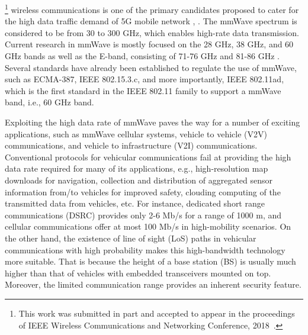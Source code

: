 \documentclass{ieeeaccess}
\begin{document}
\footnote{This work was submitted in part and accepted to appear in the proceedings of IEEE Wireless Communications and Networking Conference, 2018~\cite{shaham2018raf}.}
 wireless communications is one of the primary candidates proposed to cater for the high data traffic demand of 5G mobile network \cite{ref1}, \cite{ref2}. The mmWave spectrum is considered to be from 30 to 300 GHz, which enables high-rate data transmission. Current research in mmWave is mostly focused on the 28 GHz, 38 GHz, and 60 GHz bands as well as the E-band, consisting of 71-76 GHz and 81-86 GHz \cite{sss1}. Several standards have already been established to regulate the use of mmWave, such as ECMA-387\cite{s2}, IEEE 802.15.3.c\cite{s3}, and more importantly, IEEE 802.11ad\cite{s4}, which is the first standard in the IEEE 802.11 family to support a mmWave band, i.e., 60 GHz band.


Exploiting the high data rate of mmWave paves the way for a number of exciting applications, such as mmWave cellular systems, vehicle to vehicle (V2V) communications, and vehicle to infrastructure (V2I) communications. Conventional protocols for vehicular communications fail at providing the high data rate required for many of its applications, e.g., high-resolution map downloads for navigation, collection and distribution of aggregated sensor information from/to vehicles for improved safety, clouding computing of the transmitted data from vehicles, etc. For instance, dedicated short range communications (DSRC) provides only 2-6 Mb/s for a range of 1000 m, and cellular communications offer at most 100 Mb/s in high-mobility scenarios. On the other hand, the existence of line of sight (LoS) paths in vehicular communications with high probability makes this high-bandwidth technology more suitable. That is because the height of a base station (BS) is usually much higher than that of vehicles with embedded transceivers mounted on top. Moreover, the limited communication range provides an inherent security feature.
\end{document}
